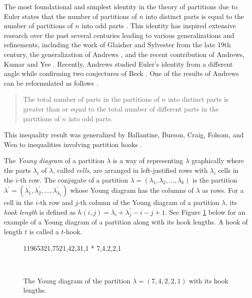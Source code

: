 \documentclass[11pt,reqno]{amsart}
\theoremstyle{remark}
\numberwithin{equation}{section}
\begin{document}
The most foundational and simplest identity in the theory of partitions due to Euler states that the number of partitions of $n$ into distinct parts is equal to the number of partitions of $n$ into odd parts \cite[Corollary 1.2]{andrews_book}. This identity has inspired extensive research over the past several centuries leading to various generalizations and refinements, including the work of Glaisher \cite{glaisher} and Sylvester \cite{sylvester} from the late 19th century, the generalization of Andrews \cite{andrews1969}, and the recent contribution of Andrews, Kumar and Yee \cite{AKY}. Recently, Andrews studied Euler's identity from a different angle while confirming two conjectures of Beck \cite{andrews2017, beck1}.  One of the results of Andrews can be reformulated as follows \cite[Theorem 2]{andrews2017}.
\begin{quote}
The total number of parts in the partitions of $n$ into distinct parts is greater than or equal to the total number of different parts in the partitions of $n$ into odd parts. 
\end{quote}

This inequality result was generalized by Ballantine, Burson, Craig, Folsom, and Wen to inequalities involving partition hooks \cite{ballantine1}.

The \textit{Young diagram} of a partition $\lambda$ is a way of representing $\lambda$ graphically where the parts $\lambda_i$ of $\lambda$, called \textit{cells}, are arranged in left-justified rows with $\lambda_i$ cells in the $i$-th row. The conjugate of a partition $\lambda = (\lambda_1,\lambda_2,\dots,\lambda_k)$ is the partition $\lambda^{\prime} = (\lambda^{\prime}_1,\lambda^{\prime}_2,\dots,\lambda^{\prime}_{\lambda_1})$ whose Young diagram has the columns of $\lambda$ as rows. For a cell in the $i$-th row and $j$-th column of the Young diagram of a partition $\lambda$, its \textit{hook length} is defined as $h(i,j) = \lambda_i + \lambda^{\prime}_{j} - i - j + 1$. See Figure \ref{fig1} below for an example of a Young diagram of a partition along with its hook lengths. A hook of length $t$ is called a $t$-hook. 
\begin{figure}[H]
\ytableaushort
{{11}{9}{6}{5}{3}{2}{1},{7}{5}{2}{1},{4}{2},{3}{1},{1}}
* {7,4,2,2,1}
\par\quad\\
\caption{The Young diagram of the partition $\lambda = (7,4,2,2,1)$ with its hook lengths.}
\label{fig1}
\end{figure}
\end{document}
